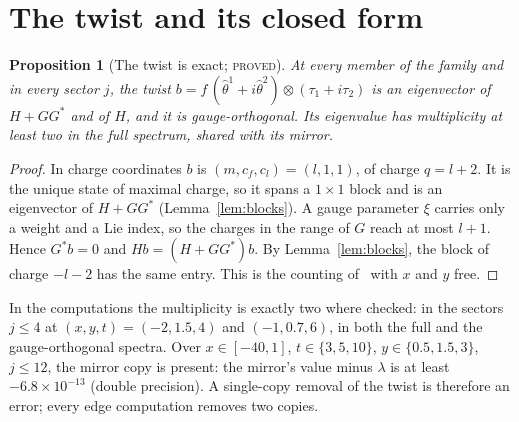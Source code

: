 \documentclass[11pt]{article}
\newtheorem{proposition}[theorem]{Proposition}
\theoremstyle{definition}
\theoremstyle{remark}
\newcommand{\PROVED}{\textsc{proved}}
\begin{document}
\section{The twist and its closed form}\label{sec:twist}

\begin{proposition}[The twist is exact; \PROVED]\label{prop:exact}
At every member of the family and in every sector $j$, the twist $b=f\,(\hat\theta^1+i\hat\theta^2)\otimes(\tau_1+i\tau_2)$
is an eigenvector of $H+GG^*$ and of $H$, and it is gauge-orthogonal. Its eigenvalue has multiplicity at least two in
the full spectrum, shared with its mirror.
\end{proposition}
\begin{proof}
In charge coordinates $b$ is $(m,c_f,c_l)=(l,1,1)$, of charge $q=l+2$. It is the unique state of maximal charge, so it
spans a $1\times1$ block and is an eigenvector of $H+GG^*$ (Lemma~\ref{lem:blocks}). A gauge parameter $\xi$ carries
only a weight and a Lie index, so the charges in the range of $G$ reach at most $l+1$. Hence $G^*b=0$ and
$Hb=(H+GG^*)b$. By Lemma~\ref{lem:blocks}, the block of charge $-l-2$ has the same entry. This is the counting
of~\cite{davisfloor2026} with $x$ and $y$ free.
\end{proof}

In the computations the multiplicity is exactly two where checked: in the sectors $j\le4$ at
$(x,y,t)=(-2,1.5,4)$ and $(-1,0.7,6)$, in both the full and the gauge-orthogonal spectra. Over $x\in[-40,1]$,
$t\in\{3,5,10\}$, $y\in\{0.5,1.5,3\}$, $j\le12$, the mirror copy is present: the mirror's value minus $\lambda$ is at least
$-6.8\times10^{-13}$ (double precision). A single-copy removal of the twist is therefore an error; every edge computation
removes two copies.
\end{document}
